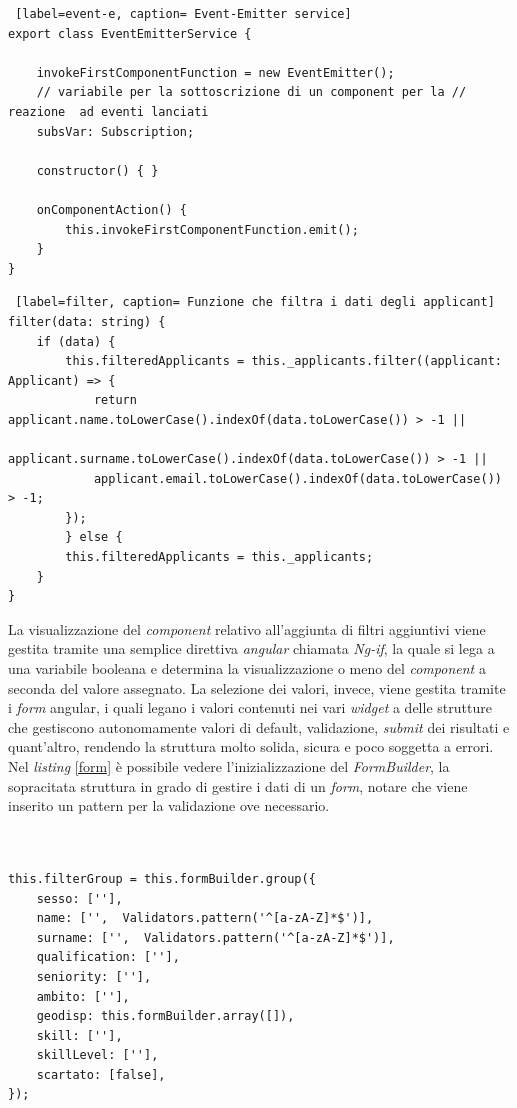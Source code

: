 \begin{lstlisting} [label=event-e, caption= Event-Emitter service]
export class EventEmitterService {

	invokeFirstComponentFunction = new EventEmitter();
	// variabile per la sottoscrizione di un component per la // reazione  ad eventi lanciati
	subsVar: Subscription;

	constructor() { }

	onComponentAction() {
		this.invokeFirstComponentFunction.emit();
	}
}
\end{lstlisting}

\begin{lstlisting} [label=filter, caption= Funzione che filtra i dati degli applicant]
filter(data: string) {
	if (data) {
		this.filteredApplicants = this._applicants.filter((applicant: Applicant) => {
			return applicant.name.toLowerCase().indexOf(data.toLowerCase()) > -1 ||
			applicant.surname.toLowerCase().indexOf(data.toLowerCase()) > -1 ||
			applicant.email.toLowerCase().indexOf(data.toLowerCase()) > -1;
		});
		} else {
		this.filteredApplicants = this._applicants;
	}
}

\end{lstlisting}

La visualizzazione del \textit{component} relativo all'aggiunta di filtri aggiuntivi viene gestita tramite una semplice direttiva \textit{angular} chiamata \textit{Ng-if}, la quale si lega a una variabile booleana e determina la visualizzazione o meno del \textit{component} a seconda del valore assegnato. La selezione dei valori, invece, viene gestita tramite i \textit{form} angular, i quali legano i valori contenuti nei vari \textit{widget} a delle strutture che gestiscono autonomamente valori di default, validazione, \textit{submit} dei risultati e quant'altro, rendendo la struttura molto solida, sicura e poco soggetta a errori.
Nel \textit{listing} \ref{form} è possibile vedere l'inizializzazione del \textit{FormBuilder}, la sopracitata struttura in grado di gestire i dati di un \textit{form}, notare che viene inserito un pattern per la validazione ove necessario.
\newpage
\begin{lstlisting}[label= form, caption= Inizializzazione di un FormBuilder]


this.filterGroup = this.formBuilder.group({
	sesso: [''],
	name: ['',  Validators.pattern('^[a-zA-Z]*$')],
	surname: ['',  Validators.pattern('^[a-zA-Z]*$')],
	qualification: [''],
	seniority: [''],
	ambito: [''],
	geodisp: this.formBuilder.array([]),
	skill: [''],
	skillLevel: [''],
	scartato: [false],
});

\end{lstlisting}

